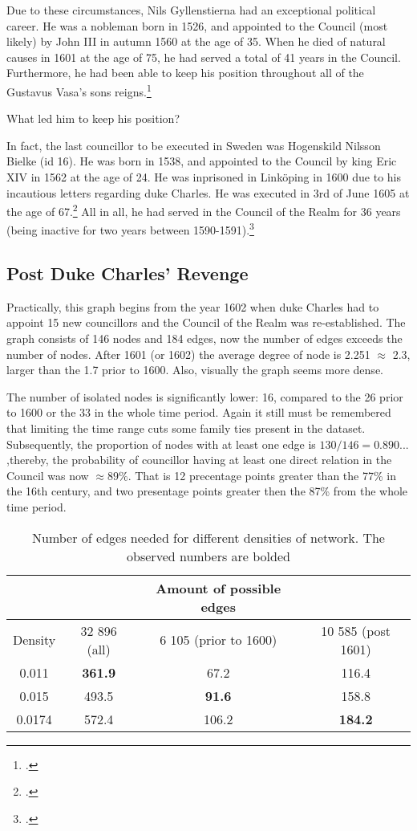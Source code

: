 Due to these circumstances, Nils Gyllenstierna had an exceptional political career. He was a nobleman born in 1526, and appointed to the Council (most likely) by John III in autumn 1560 at the age of 35. When he died of natural causes in 1601 at the age of 75, he had served a total of 41 years in the Council. Furthermore, he had been able to keep his position throughout all of the Gustavus Vasa's sons reigns.\footcite{councillorsDS} 

What led him to keep his position?

In fact, the last councillor to be executed in Sweden was Hogenskild Nilsson Bielke (id 16). He was born in 1538, and appointed to the Council by king Eric XIV in 1562 at the age of 24. He was inprisoned in Linköping in 1600 due to his incautious letters regarding duke Charles. He was executed in 3rd of June 1605 at the age of 67.\footcite{sbl_bielke_hongeskild} All in all, he had served in the Council of the Realm for 36 years (being inactive for two years between 1590-1591).\footcites[p. 58.]{HakanenAKoskinen2017}{councillorsDS}

\subsection{Post Duke Charles' Revenge}
Practically, this graph begins from the year 1602 when duke Charles had to appoint 15 new councillors and the Council of the Realm was re-established. The graph consists of 146 nodes and 184 edges, now the number of edges exceeds the number of nodes. After 1601 (or 1602) the average degree of node is 2.251 $\approx$ 2.3, larger than the 1.7 prior to 1600. Also, visually the graph seems more dense. 

The number of isolated nodes is significantly lower: 16, compared to the 26 prior to 1600 or the 33 in the whole time period. Again it still must be remembered that limiting the time range cuts some family ties present in the dataset. Subsequently, the proportion of nodes with at least one edge is $130/146=0.890...$ ,thereby, the probability of councillor having at least one direct relation in the Council was now $\approx 89\%$. That is 12 precentage points greater than the 77\% in the 16th century, and two presentage points greater then the 87\% from the whole time period.

\begin{table}
	\caption[Number of edges needed for different densities of network]{Number of edges needed for different densities of network. The observed numbers are bolded}
	\label{edges}
	\begin{tabular}{cccc}
		\hline
		&& Amount of possible edges & \\
		\hline
		Density & 32 896 (all) & 6 105 (prior to 1600) & 10 585 (post 1601) \\
		\hline 
		0.011 & \textbf{361.9} & 67.2 & 116.4 \\
		\hline
		0.015 & 493.5 & \textbf{91.6} & 158.8 \\
		\hline
		0.0174 & 572.4 & 106.2 & \textbf{184.2}\\
		\hline
	\end{tabular}
\end{table}

